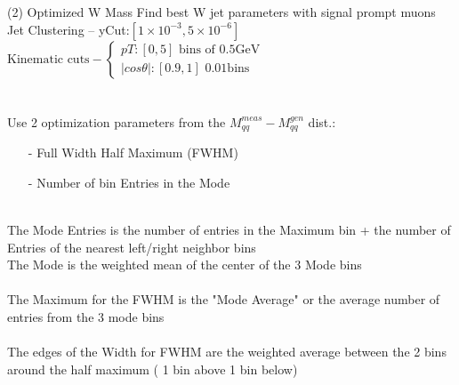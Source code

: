 \documentclass[10pt]{beamer}
\begin{document}
\begin{frame}{(2) Optimized W Mass}
Find best W jet parameters with signal prompt muons\\
\scriptsize
Jet Clustering -- yCut:$[1\times10^{-3}, 5\times10^{-6}]$ \\

$\text{Kinematic cuts} - 
\begin{cases}
	pT:[0,5]\, \, \text{bins of} \, \, 0.5 \text{GeV} \\
	|cos\theta|:[0.9,1] \, \, 0.01 \text{bins}
	\end{cases}
$\\
\quad \quad \\
\normalsize
\quad \quad \\
Use 2 optimization parameters from the $M_{qq}^{meas} - M_{qq}^{gen}$ dist.:\\
\begin{itemize}
\item[-] Full Width Half Maximum (FWHM) \\
\item[-]Number of bin Entries in the Mode\\
\end{itemize}
\quad \quad \\ 
\scriptsize
The Mode Entries is the number of entries in the Maximum bin + the number of Entries of the nearest left/right neighbor bins\\
The Mode is the weighted mean of the center of the 3 Mode bins\\
\quad \quad \\ 
The Maximum for the FWHM is the "Mode Average" or the average number of entries from the 3 mode bins\\
\quad \quad \\ 
The edges of the Width for FWHM are the weighted average between the 2 bins around the half maximum ( 1 bin above 1 bin below) 
\end{frame}
\end{document}
